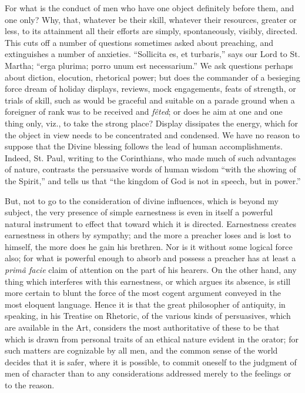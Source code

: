 For what is the conduct of men who have one object definitely
before them, and one only? Why, that, whatever be their skill,
whatever their resources, greater or less, to its attainment all their
efforts are simply, spontaneously, visibly, directed. This cuts off a
number of questions sometimes asked about preaching, and extinguishes
a number of anxieties. ``Sollicita es, et turbaris,'' says our
Lord to St. Martha; ``erga plurima; porro unum est necessarium.''
We ask questions perhaps about diction, elocution, rhetorical power;
but does the commander of a besieging force dream of holiday displays,
reviews, mock engagements, feats of strength, or trials of skill, such
as would be graceful and suitable on a parade ground when a foreigner
of rank was to be received and \emph{fêted}; or does he aim at one
and one thing only, viz., to take the strong place? Display dissipates
the energy, which for the object in view needs to be concentrated and
condensed. We have no reason to suppose that the Divine blessing
follows the lead of human accomplishments. Indeed, St. Paul, writing
to the Corinthians, who made much of such advantages of nature,
contrasts the persuasive words of human wisdom ``with the showing
of the Spirit,'' and tells us that ``the kingdom of God is not
in speech, but in power.''

But, not to go to the consideration of divine influences, which is
beyond my subject, the very presence of simple earnestness is even in
itself a powerful natural instrument to effect that toward which it is
directed. Earnestness creates earnestness in others by sympathy; and
the more a preacher loses and is lost to himself, the more does he gain
his brethren. Nor is it without some logical force also; for what is
powerful enough to absorb and possess a preacher has at least a \emph{primâ
facie} claim of attention on the part of his hearers. On the other
hand, any thing which interferes with this earnestness, or which
argues its absence, is still more certain to blunt the force of the
most cogent argument conveyed in the most eloquent language.
Hence it is that the great philosopher of antiquity, in speaking, in
his Treatise on Rhetoric, of the various kinds of persuasives, which
are available in the Art, considers the most authoritative of these to
be that which is drawn from personal traits of an ethical nature
evident in the orator; for such matters are cognizable by all men, and
the common sense of the world decides that it is safer, where it is
possible, to commit oneself to the judgment of men of character than
to any considerations addressed merely to the feelings or to the
reason.

